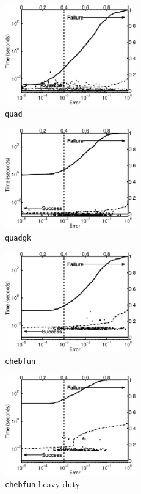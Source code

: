 \documentclass[graybox]{svmult}
\begin{document}
\begin{figure}
\centering
\begin{minipage}{5.7cm} \centering \includegraphics[width=5.7cm]{quad.eps} \\ {\tt quad} \end{minipage}
\begin{minipage}{5.7cm} \centering \includegraphics[width=5.7cm]{quadgk.eps} \\ {\tt quadgk} \end{minipage}
\begin{minipage}{5.7cm} \centering \includegraphics[width=5.7cm]{chebfun.eps} \\ {\tt chebfun} \end{minipage}
\begin{minipage}{5.7cm} \centering \includegraphics[width=5.7cm]{chebfunheavy.eps} \\ {\tt chebfun} heavy duty\end{minipage}

\end{figure}
\end{document}

